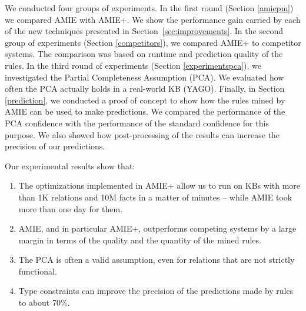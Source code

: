 
We conducted four groups of experiments.
In the first round (Section \ref{amiepm}) we compared AMIE with AMIE+. We show the performance gain carried by
each of the new techniques presented in Section~\ref{sec:improvements}.
In the second group of experiments (Section \ref{competitors}), we compared AMIE+ to competitor systems.
The comparison was based on runtime and prediction quality of the rules.
In the third round of experiments (Section \ref{experimentspca}), we investigated the Partial Completeness Assumption (PCA).
We evaluated how often the PCA actually holds in a real-world KB (YAGO).
Finally, in Section \ref{prediction}, we conducted a proof of concept to show how the rules mined by AMIE
can be used to make predictions.
We compared the performance of the PCA confidence with the performance of the standard confidence for this purpose.
We also showed how post-processing of the results can increase the precision of our predictions.

Our experimental results show that:
\begin{enumerate}
 \item The optimizations implemented in AMIE+ allow us to run on KBs with more than 1K relations and 10M facts in a matter of minutes -- while AMIE took more than one day for them.
 \item AMIE, and in particular AMIE+, outperforms competing systems by a large margin in terms of the quality and the quantity of the mined rules.
 \item The PCA is often a valid assumption, even for relations that are not strictly functional.
 \item Type constraints can improve the precision of the predictions made by rules to about 70\%.
\end{enumerate}

